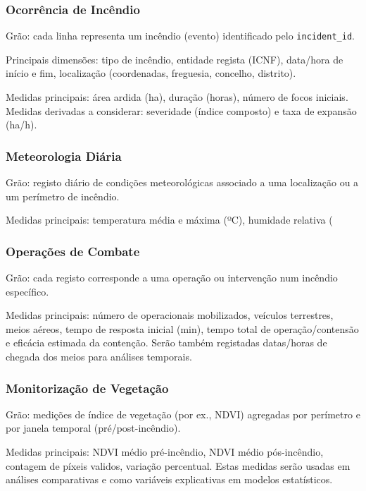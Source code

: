\subsubsection{Ocorrência de Incêndio}
Grão: cada linha representa um incêndio (evento) identificado pelo \texttt{incident\_id}.

Principais dimensões: tipo de incêndio, entidade regista (ICNF), data/hora de início e fim, localização (coordenadas, freguesia, concelho, distrito).

Medidas principais: área ardida (ha), duração (horas), número de focos iniciais. Medidas derivadas a considerar: severidade (índice composto) e taxa de expansão (ha/h).

\subsubsection{Meteorologia Diária}
Grão: registo diário de condições meteorológicas associado a uma localização ou a um perímetro de incêndio.

Medidas principais: temperatura média e máxima (ºC), humidade relativa (%

\subsubsection{Operações de Combate}
Grão: cada registo corresponde a uma operação ou intervenção num incêndio específico.

Medidas principais: número de operacionais mobilizados, veículos terrestres, meios aéreos, tempo de resposta inicial (min), tempo total de operação/contensão e eficácia estimada da contenção. Serão também registadas datas/horas de chegada dos meios para análises temporais.

\subsubsection{Monitorização de Vegetação}
Grão: medições de índice de vegetação (por ex., NDVI) agregadas por perímetro e por janela temporal (pré/post-incêndio).

Medidas principais: NDVI médio pré-incêndio, NDVI médio pós-incêndio, contagem de píxeis validos, variação percentual. Estas medidas serão usadas em análises comparativas e como variáveis explicativas em modelos estatísticos.

